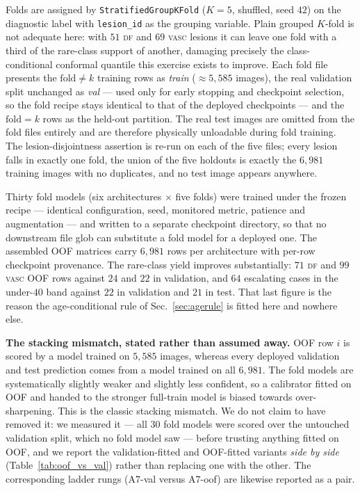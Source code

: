 \documentclass[journal]{IEEEtran}
\begin{document}
Folds are assigned by \texttt{StratifiedGroupKFold} ($K=5$, shuffled, seed $42$) on the
diagnostic label with \texttt{lesion\_id} as the grouping variable. Plain grouped $K$-fold is
not adequate here: with $51$ \textsc{df} and $69$ \textsc{vasc} lesions it can leave one fold
with a third of the rare-class support of another, damaging precisely the class-conditional
conformal quantile this exercise exists to improve. Each fold file presents the $\mathrm{fold}
\neq k$ training rows as \emph{train} ($\approx 5{,}585$ images), the real validation split
unchanged as \emph{val} --- used only for early stopping and checkpoint selection, so the fold
recipe stays identical to that of the deployed checkpoints --- and the $\mathrm{fold}=k$ rows
as the held-out partition. The real test images are omitted from the fold files entirely and
are therefore physically unloadable during fold training. The lesion-disjointness assertion is
re-run on each of the five files; every lesion falls in exactly one fold, the union of the five
holdouts is exactly the $6{,}981$ training images with no duplicates, and no test image appears
anywhere.

Thirty fold models (six architectures $\times$ five folds) were trained under the frozen
recipe --- identical configuration, seed, monitored metric, patience and augmentation --- and
written to a separate checkpoint directory, so that no downstream file glob can substitute a
fold model for a deployed one. The assembled OOF matrices carry $6{,}981$ rows per
architecture with per-row checkpoint provenance. The rare-class yield improves substantially:
$71$ \textsc{df} and $99$ \textsc{vasc} OOF rows against $24$ and $22$ in validation, and $64$
escalating cases in the under-$40$ band against $22$ in validation and $21$ in test. That
last figure is the reason the age-conditional rule of Sec.~\ref{sec:agerule} is fitted here
and nowhere else.

\textbf{The stacking mismatch, stated rather than assumed away.} OOF row $i$ is scored by a
model trained on $5{,}585$ images, whereas every deployed validation and test prediction comes
from a model trained on all $6{,}981$. The fold models are systematically slightly weaker and
slightly less confident, so a calibrator fitted on OOF and handed to the stronger full-train
model is biased towards over-sharpening. This is the classic stacking mismatch. We do not
claim to have removed it: we measured it --- all $30$ fold models were scored over the
untouched validation split, which no fold model saw --- before trusting anything fitted on
OOF, and we report the validation-fitted and OOF-fitted variants \emph{side by side}
(Table~\ref{tab:oof_vs_val}) rather than replacing one with the other. The corresponding
ladder rungs (A7-val versus A7-oof) are likewise reported as a pair.
\end{document}
